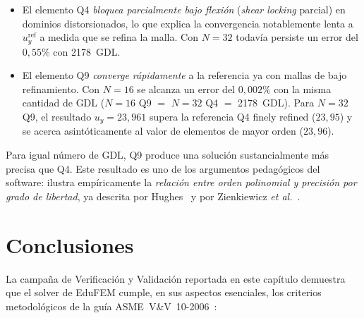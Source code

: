\begin{itemize}
  \item El elemento Q4 \emph{bloquea parcialmente bajo flexión}
        (\emph{shear locking} parcial) en dominios distorsionados, lo que
        explica la convergencia notablemente lenta a $u_y^{\mathrm{ref}}$ a
        medida que se refina la malla. Con $N=32$ todavía persiste un
        error del $0{,}55\%$ con \num{2178}~GDL.
  \item El elemento Q9 \emph{converge rápidamente} a la referencia ya con
        mallas de bajo refinamiento. Con $N=16$ se alcanza un error del
        $0{,}002\%$ con la misma cantidad de GDL ($N=16$ Q9
        $=$ $N=32$ Q4 $=$ \num{2178}~GDL). Para $N=32$ Q9, el resultado
        $u_y = 23{,}961$ supera la referencia Q4 finely refined
        ($23{,}95$) y se acerca asintóticamente al valor de elementos de
        mayor orden ($23{,}96$).
\end{itemize}

\noindent Para igual número de GDL, Q9 produce una solución
sustancialmente más precisa que Q4. Este resultado es uno de los argumentos
pedagógicos del software: ilustra empíricamente la \emph{relación entre
orden polinomial y precisión por grado de libertad}, ya descrita por
Hughes~\cite{hughes2000finite} y por Zienkiewicz \emph{et
al.}~\cite{zienkiewicz2013finite}.

\section{Conclusiones}

La campaña de Verificación y Validación reportada en este capítulo demuestra
que el solver de EduFEM cumple, en sus aspectos esenciales, los criterios
metodológicos de la guía ASME~V\&V~10-2006~\cite{asme2006vv10}:

